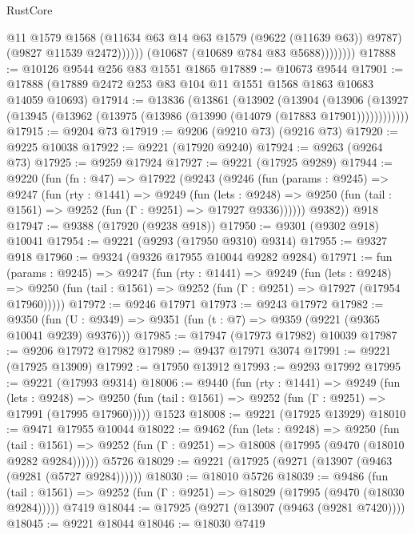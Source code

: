 \begin{lexlean}{RustCore}
\begin{coremodule}
                          @11
                          @1579
                          @1568
                          (@11634 @63 @14 @63 @1579 (@9622 (@11639 @63)) @9787)
                          (@9827 @11539 @2472))))))
                (@10687 (@10689 @784 @83 @5688))))))))
@17888 := @10126 @9544 @256 @83 @1551 @1865
@17889 := @10673 @9544
@17901 := @17888 (@17889 @2472 @253 @83 @104 @11 @1551 @1568 @1863 @10683 @14059 @10693)
@17914 := @13836
    (@13861
      (@13902
        (@13904
          (@13906 (@13927 (@13945 (@13962 (@13975 (@13986 (@13990 (@14079 (@17883 @17901))))))))))))
@17915 := @9204 @73
@17919 := @9206 (@9210 @73) (@9216 @73)
@17920 := @9225 @10038
@17922 := @9221 (@17920 @9240)
@17924 := @9263 (@9264 @73)
@17925 := @9259 @17924
@17927 := @9221 (@17925 @9289)
@17944 := @9220
    (fun (fn : @47) =>
    @17922
      (@9243
        (@9246
          (fun (params : @9245) =>
          @9247
            (fun (rty : @1441) =>
            @9249
              (fun (lets : @9248) =>
              @9250 (fun (tail : @1561) => @9252 (fun (Γ : @9251) => @17927 @9336))))))
        @9382))
    @918
@17947 := @9388 (@17920 (@9238 @918))
@17950 := @9301 (@9302 @918) @10041
@17954 := @9221 (@9293 (@17950 @9310) @9314)
@17955 := @9327 @918
@17960 := @9324 (@9326 @17955 @10044 @9282 @9284)
@17971 := fun (params : @9245) =>
  @9247
    (fun (rty : @1441) =>
    @9249
      (fun (lets : @9248) =>
      @9250 (fun (tail : @1561) => @9252 (fun (Γ : @9251) => @17927 (@17954 @17960)))))
@17972 := @9246 @17971
@17973 := @9243 @17972
@17982 := @9350
    (fun (U : @9349) => @9351 (fun (t : @7) => @9359 (@9221 (@9365 @10041 @9239) @9376)))
@17985 := @17947 (@17973 @17982) @10039
@17987 := @9206 @17972 @17982
@17989 := @9437 @17971 @3074
@17991 := @9221 (@17925 @13909)
@17992 := @17950 @13912
@17993 := @9293 @17992
@17995 := @9221 (@17993 @9314)
@18006 := @9440
    (fun (rty : @1441) =>
    @9249
      (fun (lets : @9248) =>
      @9250 (fun (tail : @1561) => @9252 (fun (Γ : @9251) => @17991 (@17995 @17960)))))
    @1523
@18008 := @9221 (@17925 @13929)
@18010 := @9471 @17955 @10044
@18022 := @9462
    (fun (lets : @9248) =>
    @9250
      (fun (tail : @1561) =>
      @9252 (fun (Γ : @9251) => @18008 (@17995 (@9470 (@18010 @9282 @9284))))))
    @5726
@18029 := @9221 (@17925 (@9271 (@13907 (@9463 (@9281 (@5727 @9284))))))
@18030 := @18010 @5726
@18039 := @9486
    (fun (tail : @1561) => @9252 (fun (Γ : @9251) => @18029 (@17995 (@9470 (@18030 @9284)))))
    @7419
@18044 := @17925 (@9271 (@13907 (@9463 (@9281 @7420))))
@18045 := @9221 @18044
@18046 := @18030 @7419

\end{coremodule}
\end{lexlean}
